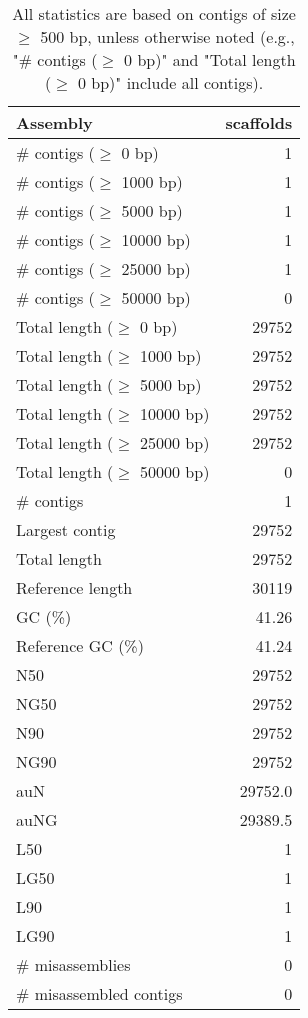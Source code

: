 \documentclass[12pt,a4paper]{article}
\begin{document}
\begin{table}[ht]
\begin{center}
\caption{All statistics are based on contigs of size $\geq$ 500 bp, unless otherwise noted (e.g., "\# contigs ($\geq$ 0 bp)" and "Total length ($\geq$ 0 bp)" include all contigs).}
\begin{tabular}{|l*{1}{|r}|}
\hline
Assembly & scaffolds \\ \hline
\# contigs ($\geq$ 0 bp) & 1 \\ \hline
\# contigs ($\geq$ 1000 bp) & 1 \\ \hline
\# contigs ($\geq$ 5000 bp) & 1 \\ \hline
\# contigs ($\geq$ 10000 bp) & 1 \\ \hline
\# contigs ($\geq$ 25000 bp) & 1 \\ \hline
\# contigs ($\geq$ 50000 bp) & 0 \\ \hline
Total length ($\geq$ 0 bp) & 29752 \\ \hline
Total length ($\geq$ 1000 bp) & 29752 \\ \hline
Total length ($\geq$ 5000 bp) & 29752 \\ \hline
Total length ($\geq$ 10000 bp) & 29752 \\ \hline
Total length ($\geq$ 25000 bp) & 29752 \\ \hline
Total length ($\geq$ 50000 bp) & 0 \\ \hline
\# contigs & 1 \\ \hline
Largest contig & 29752 \\ \hline
Total length & 29752 \\ \hline
Reference length & 30119 \\ \hline
GC (\%) & 41.26 \\ \hline
Reference GC (\%) & 41.24 \\ \hline
N50 & 29752 \\ \hline
NG50 & 29752 \\ \hline
N90 & 29752 \\ \hline
NG90 & 29752 \\ \hline
auN & 29752.0 \\ \hline
auNG & 29389.5 \\ \hline
L50 & 1 \\ \hline
LG50 & 1 \\ \hline
L90 & 1 \\ \hline
LG90 & 1 \\ \hline
\# misassemblies & 0 \\ \hline
\# misassembled contigs & 0 \\ \hline

\end{tabular}
\end{center}
\end{table}
\end{document}
